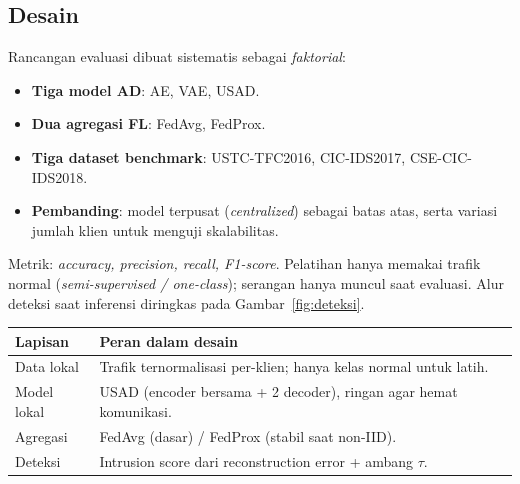 \documentclass[11pt,a4paper]{article}
\begin{document}
\subsection{Desain}
Rancangan evaluasi dibuat sistematis sebagai \emph{faktorial}:
\begin{itemize}[leftmargin=1.4em]
  \item \textbf{Tiga model AD}: AE, VAE, USAD.
  \item \textbf{Dua agregasi FL}: FedAvg, FedProx.
  \item \textbf{Tiga dataset benchmark}: USTC-TFC2016, CIC-IDS2017,
  CSE-CIC-IDS2018.
  \item \textbf{Pembanding}: model terpusat (\emph{centralized}) sebagai batas
  atas, serta variasi jumlah klien untuk menguji skalabilitas.
\end{itemize}
Metrik: \emph{accuracy, precision, recall, F1-score}. Pelatihan hanya memakai
trafik normal (\emph{semi-supervised / one-class}); serangan hanya muncul saat
evaluasi. Alur deteksi saat inferensi diringkas pada Gambar~\ref{fig:deteksi}.

\begin{center}
\footnotesize
\begin{tabular}{@{}p{2.3cm}p{11.2cm}@{}}
\toprule
\textbf{Lapisan} & \textbf{Peran dalam desain} \\
\midrule
Data lokal & Trafik ternormalisasi per-klien; hanya kelas normal untuk latih. \\
Model lokal & USAD (encoder bersama + 2 decoder), ringan agar hemat komunikasi. \\
Agregasi & FedAvg (dasar) / FedProx (stabil saat non-IID). \\
Deteksi & Intrusion score dari reconstruction error + ambang $\tau$. \\
\bottomrule
\end{tabular}
\end{center}
\end{document}
